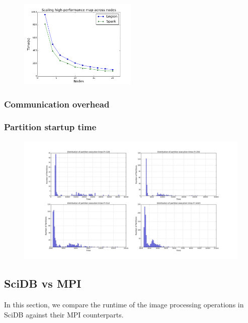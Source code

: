 \documentclass[tog]{acmsiggraph}
\begin{document}
\begin{figure}[htp]
\label{fig:scaling}\includegraphics[width=0.5\textwidth]{figures/scaling.png}
\end{figure}


\subsubsection{Communication overhead}


\subsubsection{Partition startup time}

\begin{figure}[htp] 
\label{fig:scaling}\includegraphics[width=\textwidth]{figures/partition_dist}
\end{figure}

\subsection{SciDB vs MPI}\label{sec:clusterexp}
In this section, we compare the runtime of the image processing operations in
SciDB against their MPI counterparts.
\end{document}
